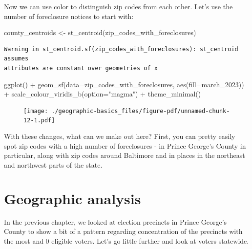 \documentclass[
  letterpaper,
  DIV=11,
  numbers=noendperiod]{scrreprt}
\newenvironment{Shaded}{\begin{snugshade}}{\end{snugshade}}
\newcommand{\AttributeTok}[1]{\textcolor[rgb]{0.40,0.45,0.13}{#1}}
\newcommand{\FunctionTok}[1]{\textcolor[rgb]{0.28,0.35,0.67}{#1}}
\newcommand{\NormalTok}[1]{\textcolor[rgb]{0.00,0.23,0.31}{#1}}
\newcommand{\OtherTok}[1]{\textcolor[rgb]{0.00,0.23,0.31}{#1}}
\newcommand{\SpecialCharTok}[1]{\textcolor[rgb]{0.37,0.37,0.37}{#1}}
\newcommand{\StringTok}[1]{\textcolor[rgb]{0.13,0.47,0.30}{#1}}
\begin{document}
Now we can use color to distinguish zip codes from each other. Let's use
the number of foreclosure notices to start with:

\begin{Shaded}
\begin{Highlighting}[]
\NormalTok{county\_centroids }\OtherTok{\textless{}{-}} \FunctionTok{st\_centroid}\NormalTok{(zip\_codes\_with\_foreclosures)}
\end{Highlighting}
\end{Shaded}

\begin{verbatim}
Warning in st_centroid.sf(zip_codes_with_foreclosures): st_centroid assumes
attributes are constant over geometries of x
\end{verbatim}

\begin{Shaded}
\begin{Highlighting}[]
\FunctionTok{ggplot}\NormalTok{() }\SpecialCharTok{+}
  \FunctionTok{geom\_sf}\NormalTok{(}\AttributeTok{data=}\NormalTok{zip\_codes\_with\_foreclosures, }\FunctionTok{aes}\NormalTok{(}\AttributeTok{fill=}\NormalTok{march\_2023)) }\SpecialCharTok{+}
  \FunctionTok{scale\_colour\_viridis\_b}\NormalTok{(}\AttributeTok{option=}\StringTok{"magma"}\NormalTok{) }\SpecialCharTok{+}
  \FunctionTok{theme\_minimal}\NormalTok{()}
\end{Highlighting}
\end{Shaded}

\begin{figure}[H]

{\centering \texttt{[image: ./geographic-basics\_files/figure-pdf/unnamed-chunk-12-1.pdf]}

}

\end{figure}

With these changes, what can we make out here? First, you can pretty
easily spot zip codes with a high number of foreclosures - in Prince
George's County in particular, along with zip codes around Baltimore and
in places in the northeast and northwest parts of the state.


\hypertarget{geographic-analysis}{%
\chapter{Geographic analysis}\label{geographic-analysis}}

In the previous chapter, we looked at election precincts in Prince
George's County to show a bit of a pattern regarding concentration of
the precincts with the most and 0 eligible voters. Let's go little
further and look at voters statewide.
\end{document}
